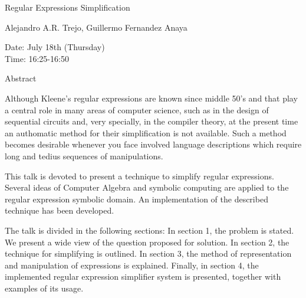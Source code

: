 \begin{center}
\LARGE
Regular Expressions Simplification

\end{center}

\begin{center}
\Large
Alejandro A.R. Trejo, Guillermo Fernandez Anaya

\end{center}

\noindent
Date:  July 18th (Thursday)\\
Time:  16:25-16:50\\

\begin{center}
\large
Abstract
\end{center}

Although Kleene's regular expressions are known since middle 50's and that play a central role in
many areas of computer science, such as in the design of sequential circuits and, very specially, in
the compiler theory, at the present time an authomatic method for their simplification is not
available. Such a method becomes desirable whenever you face involved language descriptions
which require long and tedius sequences of manipulations. 

This talk is devoted to present a technique to simplify regular expressions. Several ideas of
Computer Algebra and symbolic computing are applied to the regular expression symbolic
domain. An implementation of the described technique has been developed. 

The talk is divided in the following sections:
In section 1, the problem is stated. We present a wide view of the question proposed for solution. 
In section 2, the technique for simplifying is outlined. In section 3, the method of representation
and manipulation of expressions is explained. Finally, in section 4, the implemented regular
expression simplifier system is presented, together with examples of its usage. 

